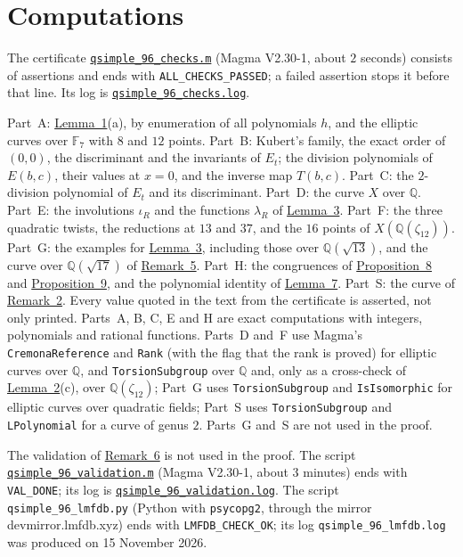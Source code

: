 \documentclass[11pt]{article}
\newcommand{\Q}{\mathbb Q}
\newcommand{\F}{\mathbb F}
\begin{document}
\section{Computations}\label{computations}

The certificate
\href{https://genus-2-torsion.github.io/data/knowledge/sources/qsimple_96_checks.m}{\texttt{qsimple\_96\_checks.m}}
(Magma V2.30-1, about \(2\) seconds) consists of assertions and ends with \texttt{ALL\_CHECKS\_PASSED}; a failed
assertion stops it before that line. Its log is
\href{https://genus-2-torsion.github.io/data/knowledge/sources/qsimple_96_checks.log}{\texttt{qsimple\_96\_checks.log}}.

Part~A: \hyperref[lemma-five]{Lemma~1}(a), by enumeration of all polynomials \(h\), and the elliptic curves over
\(\F_7\) with \(8\) and \(12\) points. Part~B: Kubert's family, the exact order of \((0,0)\), the discriminant
and the invariants of \(E_t\); the division polynomials of \(E(b,c)\), their values at \(x=0\), and the inverse
map \(T(b,c)\). Part~C: the \(2\)-division polynomial of \(E_t\) and its discriminant. Part~D: the curve \(X\)
over \(\Q\). Part~E: the involutions \(\iota_R\) and the functions \(\lambda_R\) of
\hyperref[lemma-basechange]{Lemma~3}. Part~F: the three quadratic twists, the reductions at \(13\) and \(37\),
and the \(16\) points of \(X(\Q(\zeta_{12}))\). Part~G: the examples for
\hyperref[lemma-basechange]{Lemma~3}, including those over \(\Q(\sqrt{13})\), and the curve over
\(\Q(\sqrt{17})\) of \hyperref[rem-bn]{Remark~5}. Part~H: the congruences of
\hyperref[prop-rot]{Proposition~8} and \hyperref[prop-v4]{Proposition~9}, and the polynomial identity of
\hyperref[lemma-inv]{Lemma~7}. Part~S: the curve of \hyperref[rem-sharp]{Remark~2}. Every value quoted in the
text from the certificate is asserted, not only printed. Parts~A, B, C, E and H are exact computations with
integers, polynomials and rational functions. Parts~D and~F use Magma's \texttt{CremonaReference} and \texttt{Rank}
(with the flag that the rank is proved) for elliptic curves over \(\Q\), and \texttt{TorsionSubgroup} over \(\Q\)
and, only as a cross-check of \hyperref[lemma-curve]{Lemma~2}(c), over \(\Q(\zeta_{12})\); Part~G uses \texttt{TorsionSubgroup} and \texttt{IsIsomorphic} for elliptic curves over
quadratic fields; Part~S uses \texttt{TorsionSubgroup} and \texttt{LPolynomial} for a curve of genus \(2\). Parts~G
and~S are not used in the proof.

The validation of \hyperref[rem-val]{Remark~6} is not used in the proof. The script
\href{https://genus-2-torsion.github.io/data/knowledge/sources/qsimple_96_validation.m}{\texttt{qsimple\_96\_\allowbreak validation.m}}
(Magma V2.30-1, about \(3\) minutes) ends with \texttt{VAL\_DONE}; its log is
\href{https://genus-2-torsion.github.io/data/knowledge/sources/qsimple_96_validation.log}{\texttt{qsimple\_96\_\allowbreak validation.log}}.
The script \texttt{qsimple\_96\_lmfdb.py} (Python with \texttt{psycopg2}, through the mirror
devmirror.lmfdb.xyz) ends with \texttt{LMFDB\_CHECK\_OK}; its log \texttt{qsimple\_96\_lmfdb.log} was produced on
15 November 2026.
\end{document}
